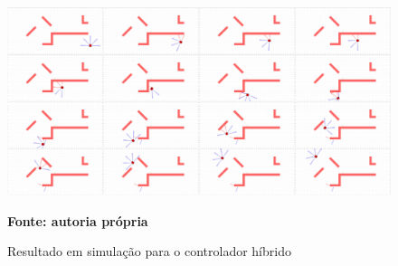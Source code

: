 \begin{figure}[ht]
\centering
\caption{Resultado em simulação para o controlador híbrido}
\label{fig:resultadoSimulacaoHibrido}
		\centering
		\includegraphics[clip, 
scale=0.29]{Figuras/simulacao_hibridoCompactado}
		
	\textbf{Fonte: autoria própria}
\end{figure}